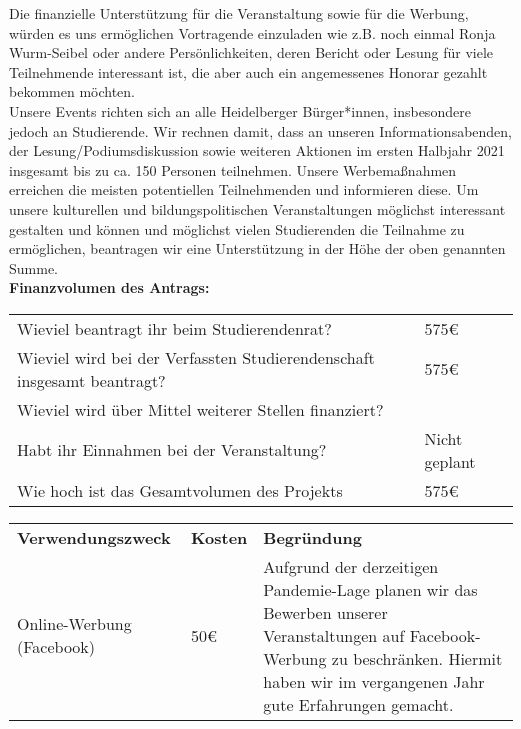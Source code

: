 {    Die finanzielle Unterstützung für die Veranstaltung sowie für die Werbung, würden es uns ermöglichen Vortragende einzuladen wie z.B. noch einmal Ronja Wurm-Seibel oder andere Persönlichkeiten, deren Bericht oder Lesung für viele Teilnehmende interessant ist, die aber auch ein angemessenes Honorar gezahlt bekommen möchten.\\
    Unsere Events richten sich an alle Heidelberger Bürger*innen, insbesondere jedoch an Studierende. Wir rechnen damit, dass an unseren Informationsabenden, der Lesung/Podiumsdiskussion sowie weiteren Aktionen im ersten Halbjahr 2021 insgesamt bis zu ca. 150 Personen teilnehmen. Unsere Werbemaßnahmen erreichen die meisten potentiellen Teilnehmenden und informieren diese. Um unsere kulturellen und bildungspolitischen Veranstaltungen möglichst interessant gestalten und können und möglichst vielen Studierenden die Teilnahme zu ermöglichen, beantragen wir eine Unterstützung in der Höhe der oben genannten Summe.\\[1em]
    \textbf{Finanzvolumen des Antrags:}\\
    \newline
    \begin{tabular}{l l}
        Wieviel beantragt ihr beim Studierendenrat?                             & 575€                     \\
        Wieviel wird bei der Verfassten Studierendenschaft insgesamt beantragt? & 575€    \\
        Wieviel wird über Mittel weiterer Stellen finanziert?                   &           \\
        Habt ihr Einnahmen bei der Veranstaltung?                               & Nicht geplant                      \\
        Wie hoch ist das Gesamtvolumen des Projekts                             & 575€ \\
    \end{tabular}
    \newline
    \vspace*{2em}
    \newline
    \begin{tabular}{p{4cm} p{2cm} p{9cm}}
        \textbf{Verwendungszweck} & \textbf{Kosten} & \textbf{Begründung} \\
        Online-Werbung (Facebook) & 50€ & Aufgrund der derzeitigen Pandemie-Lage planen wir das Bewerben unserer Veranstaltungen auf Facebook-Werbung zu beschränken. Hiermit haben wir im vergangenen Jahr gute Erfahrungen gemacht. \\

\end{tabular}}
